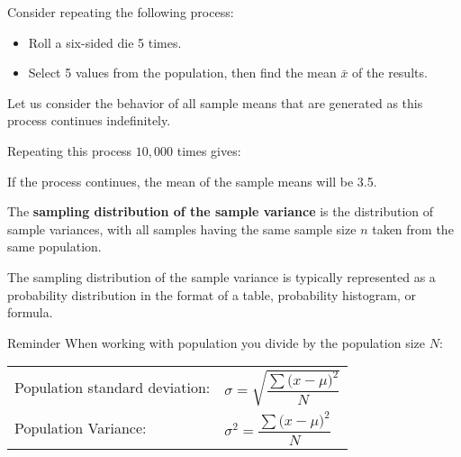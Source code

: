 \documentclass{beamer}
\begin{document}
\begin{frame}
\begin{example}
Consider repeating the following process:
\begin{itemize}
\item Roll a six-sided die 5 times.
\item Select 5 values from the population, then find the mean $\bar{x}$ of the results.
\end{itemize}\pause
Let us consider the behavior of all sample means that are generated as this process continues indefinitely.\pause

\vspace{2mm}
Repeating this process $10,000$ times gives:

\vspace{-5mm}
\begin{center}
\end{center}\pause

\vspace{-5mm}
If the process continues, the mean of the sample means will be 3.5.
\end{example}
\end{frame}

\begin{frame}
\begin{definition}
The \textbf{sampling distribution of the sample variance} is the distribution of sample variances, with all samples having the same sample size $n$ taken from the same population.
\end{definition}\pause

\begin{note}
The sampling distribution of the sample variance is typically represented as a probability distribution in the format of a table, probability histogram, or formula.
\end{note}\pause

\begin{block}{Reminder}
When working with population you divide by the population size $N$:
\begin{center}
\begin{tabular}{ll}
Population standard deviation: & $\sigma=\sqrt{\dfrac{\sum{(x-\mu})^2}{N}}$\\
Population Variance: & $\sigma^2 = \dfrac{\sum{(x-\mu})^2}{N}$
\end{tabular}
\end{center}
\end{block}
\end{frame}
\end{document}
